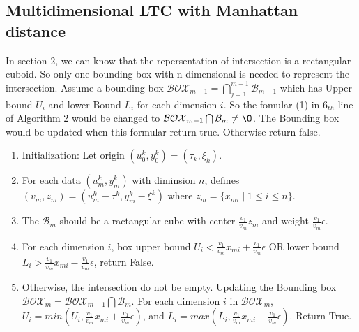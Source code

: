 \documentclass[10pt, conference, compsocconf]{IEEEtran}
\begin{document}
\subsection{Multidimensional LTC with Manhattan distance}
In section 2, we can know that the repersentation of intersection
is a rectangular cuboid. So only one bounding box with n-dimensional
is needed to represent the intersection. Assume a bounding box
$\mathcal{BOX}_{m-1} = \bigcap_{j=1}^{m-1}{\mathcal{B}_{m-1}}$ which
has Upper bound $U_i$ and lower Bound $L_i$ for each dimension
$i$. So the fomular (1) in $6_{th}$ line of Algorithm 2 would
be changed to $\mathcal{BOX}_{m-1} \bigcap \mathcal{B}_{m} \neq \O $. The Bounding box
would be updated when this formular return true.
Otherwise return false.
\begin{enumerate}
    \item Initialization: Let origin $(u^k_0, y^k_0) = (\tau_k, \xi_k)$.
    \item For each data $(u_m^k, y_m^k)$ with diminsion $n$,
            defines $(v_m, z_m) = (u_m^k - \tau^k, y_m^k - \xi^k)$ where $z_m =
            \{ x_{mi} \mid 1\leqslant{i}\leqslant{n}\}$.
    \item The $\mathcal{B}_{m}$ should be a ractangular cube with center
            $\frac{v_1}{v_m}z_m$ and weight $\frac{v_1}{v_m}\epsilon$.
    \item For each dimension $i$, box upper bound $U_i < \frac{v_1}{v_m}x_{mi}+
            \frac{v_1}{v_m}\epsilon$ OR lower bound $L_i > \frac{v_1}{v_m}x_{mi}-\frac{v_1}{v_m}\epsilon$, return False.
    \item Otherwise, the intersection do not be empty. Updating
            the Bounding box $\mathcal{BOX}_m = \mathcal{BOX}_{m-1} \bigcap \mathcal{B}_{m}$. For
            each dimension $i$ in $\mathcal{BOX}_m$, $U_i = min(U_i, \frac{v_1}{v_m}x_{mi}+
            \frac{v_1}{v_m}\epsilon)$, and $L_i = max(L_i , \frac{v_1}{v_m}x_{mi}-\frac{v_1}{v_m}\epsilon)$. Return True.
\end{enumerate}


\end{document}
